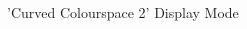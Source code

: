 \clearpage
\begin{figure}[H]
    \centering
    \begin{adjustbox}{width=12cm,center}
    \end{adjustbox}
\caption{'Curved Colourspace 2' Display Mode}
\end{figure}

